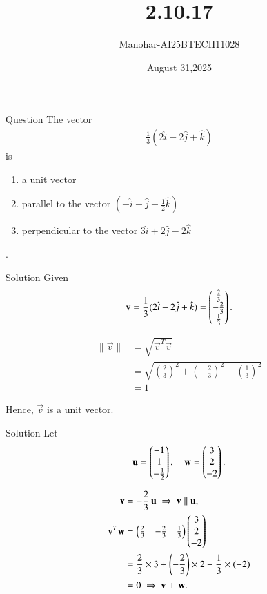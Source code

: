 \documentclass{beamer}
\title 
{2.10.17}
\date{August 31,2025}
\author 
{Manohar-AI25BTECH11028}
\begin{document}
\frame{\titlepage}
\begin{frame}{Question}
The vector 
\begin{align*}
\frac{1}{3} (2\hat i - 2\hat j + \hat k)
\end{align*}
is
\begin{enumerate}
\item a unit vector
\item parallel to the vector $(-\hat i + \hat j - \frac{1}{2} \hat k)$
\item perpendicular to the vector $3 \hat i + 2 \hat j - 2 \hat k$
\end{enumerate}.
\end{frame}

\begin{frame}{Solution}
Given
\[
\mathbf v = \frac{1}{3}(2\hat i - 2\hat j + \hat k)
= \begin{pmatrix}\frac{2}{3}\\ -\frac{2}{3}\\ \frac{1}{3}\end{pmatrix}.
\]

\begin{align*}
\|\vec v\| &= \sqrt{\vec v^T \vec v} \\
&= \sqrt{\left(\frac{2}{3}\right)^2 + \left(-\frac{2}{3}\right)^2 + \left(\frac{1}{3}\right)^2} \\
&= 1
\end{align*}

Hence, $\vec v$ is a unit vector.



\end{frame}
\begin{frame}{Solution}
Let 
\[
\mathbf u = \begin{pmatrix}-1\\ 1\\ -\frac{1}{2}\end{pmatrix}, 
\quad
\mathbf w = \begin{pmatrix}3\\ 2\\ -2\end{pmatrix}.
\]

\begin{align*}
\mathbf v &= -\frac{2}{3}\,\mathbf u \;\Rightarrow\; \mathbf v \parallel \mathbf u, \\
\mathbf v^T \mathbf w &= \begin{pmatrix}\frac{2}{3}& -\frac{2}{3}& \frac{1}{3}\end{pmatrix}
\begin{pmatrix}3\\ 2\\ -2\end{pmatrix} \\
&= \frac{2}{3}\times 3 + \left(-\frac{2}{3}\right)\times 2 + \frac{1}{3}\times(-2) \\
&= 0 \;\Rightarrow\; \mathbf v \perp \mathbf w.
\end{align*}
\end{frame}
\end{document}
